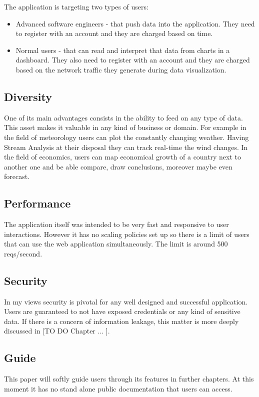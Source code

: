 The application is targeting two types of users:
\begin{itemize}
	\item Advanced software engineers - that push data into the application. They need to register with an account and they are charged based on time.
	\item Normal users - that can read and interpret that data from charts in a dashboard. They also need to register with an account and they are charged based on the network traffic they generate during data visualization.
\end{itemize}

\subsection{Diversity}
\label{chap:02:01:02}
One of its main advantages consists in the ability to feed on any type of data. This asset makes it valuable in any kind of business or domain. For example in the field of meteorology users can plot the constantly changing weather. Having Stream Analysis at their disposal they can track real-time the wind changes. In the field of economics, users can map economical growth of a country next to another one and be able compare, draw conclusions, moreover maybe even forecast.

\subsection{Performance}
\label{chap:02:01:03}
The application itself was intended to be very fast and responsive to user interactions. However it has no scaling policies set up so there is a limit of users that can use the web application simultaneously. The limit is around 500 reqs/second.

\subsection{Security}
\label{chap:02:01:04}
In my views security is pivotal for any well designed and successful application. Users are guaranteed to not have exposed credentials or any kind of sensitive data. If there is a concern of information leakage, this matter is more deeply discussed in [TO DO Chapter ... ].  

\subsection{Guide}
\label{chap:02:01:05}
This paper will softly guide users through its features in further chapters. At this moment it has no stand alone public documentation that users can access.

